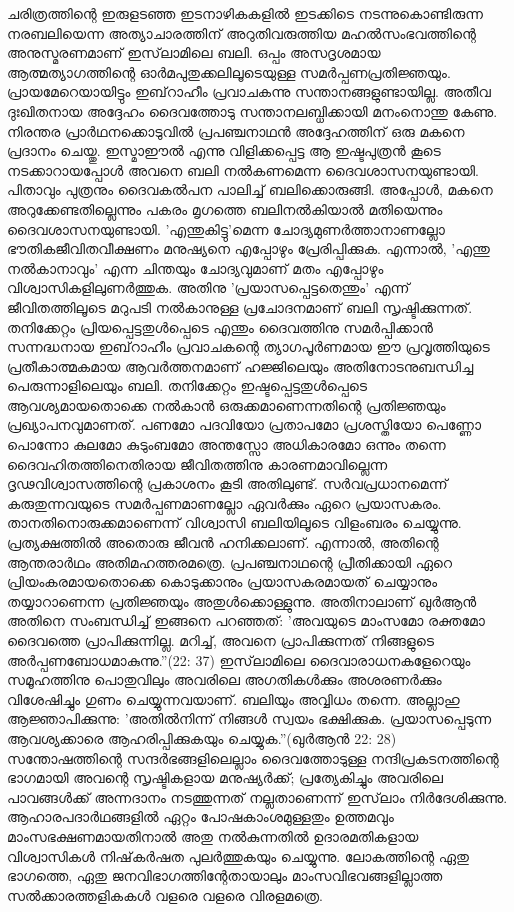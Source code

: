 ചരിത്രത്തിന്റെ ഇരുളടഞ്ഞ ഇടനാഴികകളില്‍ ഇടക്കിടെ നടന്നുകൊണ്ടിരുന്ന നരബലിയെന്ന അത്യാചാരത്തിന് അറുതിവരുത്തിയ മഹല്‍സംഭവത്തിന്റെ അനുസ്മരണമാണ് ഇസ്‌ലാമിലെ ബലി. ഒപ്പം അസദൃശമായ ആത്മത്യാഗത്തിന്റെ ഓര്‍മപുതുക്കലിലൂടെയുള്ള സമര്‍പ്പണപ്രതിജ്ഞയും.
പ്രായമേറെയായിട്ടും ഇബ്‌റാഹീം പ്രവാചകന്നു സന്താനങ്ങളുണ്ടായില്ല. അതീവ ദുഃഖിതനായ അദ്ദേഹം ദൈവത്തോടു സന്താനലബ്ധിക്കായി മനംനൊന്തു കേണു. നിരന്തര പ്രാര്‍ഥനക്കൊടുവില്‍ പ്രപഞ്ചനാഥന്‍ അദ്ദേഹത്തിന് ഒരു മകനെ പ്രദാനം ചെയ്തു. ഇസ്മാഈല്‍ എന്നു വിളിക്കപ്പെട്ട ആ ഇഷ്ടപുത്രന്‍ കൂടെ നടക്കാറായപ്പോള്‍ അവനെ ബലി നല്‍കണമെന്ന ദൈവശാസനയുണ്ടായി. പിതാവും പുത്രനും ദൈവകല്‍പന പാലിച്ച് ബലിക്കൊരുങ്ങി. അപ്പോള്‍, മകനെ അറുക്കേണ്ടതില്ലെന്നും പകരം മൃഗത്തെ ബലിനല്‍കിയാല്‍ മതിയെന്നും ദൈവശാസനയുണ്ടായി.
'എന്തുകിട്ടു'മെന്ന ചോദ്യമുണര്‍ത്താനാണല്ലോ ഭൗതികജീവിതവീക്ഷണം മനുഷ്യനെ എപ്പോഴും പ്രേരിപ്പിക്കുക. എന്നാല്‍, 'എന്തു നല്‍കാനാവും' എന്ന ചിന്തയും ചോദ്യവുമാണ് മതം എപ്പോഴും വിശ്വാസികളിലുണര്‍ത്തുക. അതിനു 'പ്രയാസപ്പെട്ടതെന്തും' എന്ന് ജീവിതത്തിലൂടെ മറുപടി നല്‍കാനുള്ള പ്രചോദനമാണ് ബലി സൃഷ്ടിക്കുന്നത്.
തനിക്കേറ്റം പ്രിയപ്പെട്ടതുള്‍പ്പെടെ എന്തും ദൈവത്തിനു സമര്‍പ്പിക്കാന്‍ സന്നദ്ധനായ ഇബ്‌റാഹീം പ്രവാചകന്റെ ത്യാഗപൂര്‍ണമായ ഈ പ്രവൃത്തിയുടെ പ്രതീകാത്മകമായ ആവര്‍ത്തനമാണ് ഹജ്ജിലെയും അതിനോടനുബന്ധിച്ച പെരുന്നാളിലെയും ബലി. തനിക്കേറ്റം ഇഷ്ടപ്പെട്ടതുള്‍പ്പെടെ ആവശ്യമായതൊക്കെ നല്‍കാന്‍ ഒരുക്കമാണെന്നതിന്റെ പ്രതിജ്ഞയും പ്രഖ്യാപനവുമാണത്. പണമോ പദവിയോ പ്രതാപമോ പ്രശസ്തിയോ പെണ്ണോ പൊന്നോ കുലമോ കുടുംബമോ അന്തസ്സോ അധികാരമോ ഒന്നും തന്നെ ദൈവഹിതത്തിനെതിരായ ജീവിതത്തിനു കാരണമാവില്ലെന്ന ദൃഢവിശ്വാസത്തിന്റെ പ്രകാശനം കൂടി അതിലുണ്ട്.
സര്‍വപ്രധാനമെന്ന് കരുതുന്നവയുടെ സമര്‍പ്പണമാണല്ലോ ഏവര്‍ക്കും ഏറെ പ്രയാസകരം. താനതിനൊരുക്കമാണെന്ന് വിശ്വാസി ബലിയിലൂടെ വിളംബരം ചെയ്യുന്നു. പ്രത്യക്ഷത്തില്‍ അതൊരു ജീവന്‍ ഹനിക്കലാണ്. എന്നാല്‍, അതിന്റെ ആന്തരാര്‍ഥം അതിമഹത്തരമത്രെ. പ്രപഞ്ചനാഥന്റെ പ്രീതിക്കായി ഏറെ പ്രിയംകരമായതൊക്കെ കൊടുക്കാനും പ്രയാസകരമായത് ചെയ്യാനും തയ്യാറാണെന്ന പ്രതിജ്ഞയും അതുള്‍ക്കൊള്ളുന്നു. അതിനാലാണ് ഖുര്‍ആന്‍ അതിനെ സംബന്ധിച്ച് ഇങ്ങനെ പറഞ്ഞത്: 'അവയുടെ മാംസമോ രക്തമോ ദൈവത്തെ പ്രാപിക്കുന്നില്ല. മറിച്ച്, അവനെ പ്രാപിക്കുന്നത് നിങ്ങളുടെ അര്‍പ്പണബോധമാകുന്നു.''(22: 37)
ഇസ്‌ലാമിലെ ദൈവാരാധനകളേറെയും സമൂഹത്തിനു പൊതുവിലും അവരിലെ അഗതികള്‍ക്കും അശരണര്‍ക്കും വിശേഷിച്ചും ഗുണം ചെയ്യുന്നവയാണ്. ബലിയും അവ്വിധം തന്നെ. അല്ലാഹു ആജ്ഞാപിക്കുന്നു: 'അതില്‍നിന്ന് നിങ്ങള്‍ സ്വയം ഭക്ഷിക്കുക. പ്രയാസപ്പെടുന്ന ആവശ്യക്കാരെ ആഹരിപ്പിക്കുകയും ചെയ്യുക.''(ഖുര്‍ആന്‍ 22: 28)
സന്തോഷത്തിന്റെ സന്ദര്‍ഭങ്ങളിലെല്ലാം ദൈവത്തോടുള്ള നന്ദിപ്രകടനത്തിന്റെ ഭാഗമായി അവന്റെ സൃഷ്ടികളായ മനുഷ്യര്‍ക്ക്; പ്രത്യേകിച്ചും അവരിലെ പാവങ്ങള്‍ക്ക് അന്നദാനം നടത്തുന്നത് നല്ലതാണെന്ന് ഇസ്‌ലാം നിര്‍ദേശിക്കുന്നു. ആഹാരപദാര്‍ഥങ്ങളില്‍ ഏറ്റം പോഷകാംശമുള്ളതും ഉത്തമവും മാംസഭക്ഷണമായതിനാല്‍ അതു നല്‍കുന്നതില്‍ ഉദാരമതികളായ വിശ്വാസികള്‍ നിഷ്‌കര്‍ഷത പുലര്‍ത്തുകയും ചെയ്യുന്നു. ലോകത്തിന്റെ ഏതു ഭാഗത്തെ, ഏതു ജനവിഭാഗത്തിന്റേതായാലും മാംസവിഭവങ്ങളില്ലാത്ത സല്‍ക്കാരത്തളികകള്‍ വളരെ വളരെ വിരളമത്രെ.
